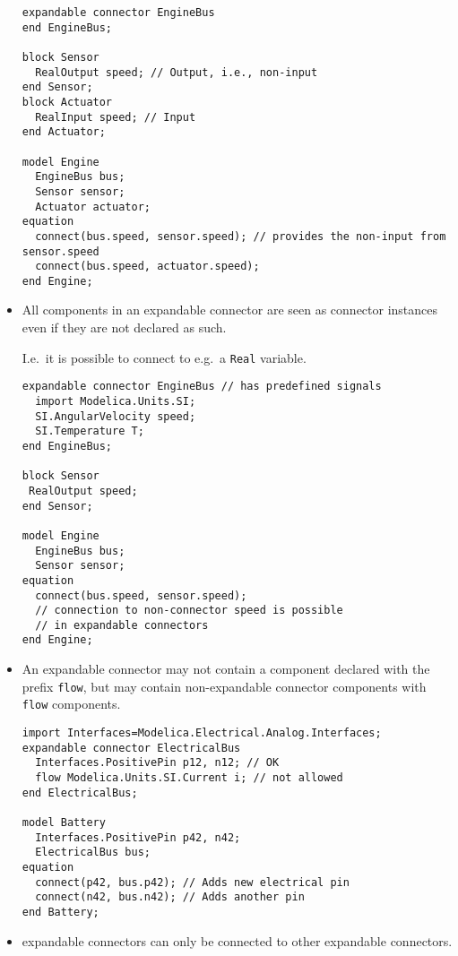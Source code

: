 \begin{itemize}
\begin{example}
\begin{lstlisting}[language=modelica]
expandable connector EngineBus
end EngineBus;

block Sensor
  RealOutput speed; // Output, i.e., non-input
end Sensor;
block Actuator
  RealInput speed; // Input
end Actuator;

model Engine
  EngineBus bus;
  Sensor sensor;
  Actuator actuator;
equation
  connect(bus.speed, sensor.speed); // provides the non-input from sensor.speed
  connect(bus.speed, actuator.speed);
end Engine;
\end{lstlisting}
\end{example}

\item
  All components in an expandable connector are seen as connector
  instances even if they are not declared as such.
  \begin{nonnormative}
  I.e.\ it is possible to connect to e.g.\ a \lstinline!Real! variable.
  \end{nonnormative}

\begin{example}
\begin{lstlisting}[language=modelica]
expandable connector EngineBus // has predefined signals
  import Modelica.Units.SI;
  SI.AngularVelocity speed;
  SI.Temperature T;
end EngineBus;

block Sensor
 RealOutput speed;
end Sensor;

model Engine
  EngineBus bus;
  Sensor sensor;
equation
  connect(bus.speed, sensor.speed);
  // connection to non-connector speed is possible
  // in expandable connectors
end Engine;
\end{lstlisting}
\end{example}

\item
  An expandable connector may not contain a component declared with the
  prefix \lstinline!flow!, but may contain non-expandable connector components with
  \lstinline!flow! components.

\begin{example}
\begin{lstlisting}[language=modelica]
import Interfaces=Modelica.Electrical.Analog.Interfaces;
expandable connector ElectricalBus
  Interfaces.PositivePin p12, n12; // OK
  flow Modelica.Units.SI.Current i; // not allowed
end ElectricalBus;

model Battery
  Interfaces.PositivePin p42, n42;
  ElectricalBus bus;
equation
  connect(p42, bus.p42); // Adds new electrical pin
  connect(n42, bus.n42); // Adds another pin
end Battery;
\end{lstlisting}
\end{example}

\item
  expandable connectors can only be connected to other expandable
  connectors.
\end{itemize}
